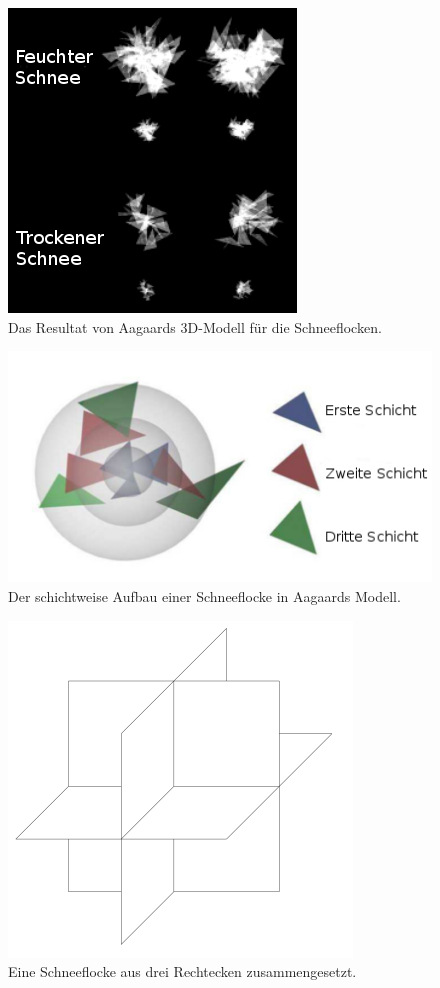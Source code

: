 \begin{figure}[ht]
    \centering
    \includegraphics{images/aagaard_layer_model}
    \caption{Das Resultat von Aagaards 3D-Modell für die Schneeflocken.}
    \label{fig:implementation_aagaard_layer_model}
\end{figure}

\begin{figure}[ht]
    \centering
    \includegraphics{images/aagaard_spheres}
    \caption{Der schichtweise Aufbau einer Schneeflocke in Aagaards Modell.}
    \label{fig:implementation_aagaard_spheres}
\end{figure}

\begin{figure}[ht]
    \centering
    \includegraphics{images/snowflake_three_rectangles}
    \caption{Eine Schneeflocke aus drei Rechtecken zusammengesetzt.}
    \label{fig:implementation_snowflake_three_rectangles}
\end{figure}

